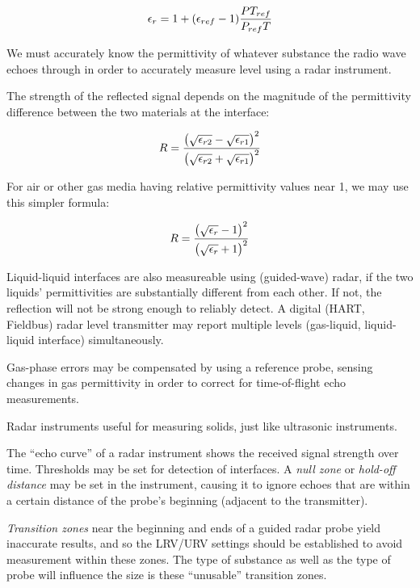 $$\epsilon_r = 1 + (\epsilon_{ref} - 1) {P T_{ref} \over P_{ref} T}$$

We must accurately know the permittivity of whatever substance the radio wave echoes through in order to accurately measure level using a radar instrument.

\vskip 10pt

The strength of the reflected signal depends on the magnitude of the permittivity difference between the two materials at the interface:

$$R = {\left({\sqrt{\epsilon_{r2}} - \sqrt{\epsilon_{r1}}}\right)^2 \over \left(\sqrt{\epsilon_{r2}} + \sqrt{\epsilon_{r1}}\right)^2}$$

For air or other gas media having relative permittivity values near 1, we may use this simpler formula:

$$R = {\left({\sqrt{\epsilon_{r}} - 1}\right)^2 \over \left(\sqrt{\epsilon_{r}} + 1 \right)^2}$$

Liquid-liquid interfaces are also measureable using (guided-wave) radar, if the two liquids' permittivities are substantially different from each other.  If not, the reflection will not be strong enough to reliably detect.  A digital (HART, Fieldbus) radar level transmitter may report multiple levels (gas-liquid, liquid-liquid interface) simultaneously.

\vskip 10pt

Gas-phase errors may be compensated by using a reference probe, sensing changes in gas permittivity in order to correct for time-of-flight echo measurements.

\vskip 10pt

Radar instruments useful for measuring solids, just like ultrasonic instruments.

\vskip 10pt

The ``echo curve'' of a radar instrument shows the received signal strength over time.  Thresholds may be set for detection of interfaces.  A {\it null zone} or {\it hold-off distance} may be set in the instrument, causing it to ignore echoes that are within a certain distance of the probe's beginning (adjacent to the transmitter).

\vskip 10pt

{\it Transition zones} near the beginning and ends of a guided radar probe yield inaccurate results, and so the LRV/URV settings should be established to avoid measurement within these zones.  The type of substance as well as the type of probe will influence the size is these ``unusable'' transition zones.





